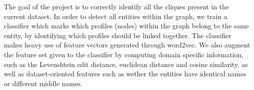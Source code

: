 The goal of the project is to correctly identify all the cliques present in the
current dataset. In order to detect all entities within the graph, we train a
classifier which marks which profiles (nodes) within the graph belong to the same
entity, by identifying which profiles should be linked together. The classifier
makes heavy use of feature vectors generated through word2vec. We also augment
the feature set given to the classifier by computing domain specific information,
such as the Levenshtein edit distance, euclidean distance and cosine similarity,
as well as dataset-oriented features such as wether the entities have identical
names or different middle names.
